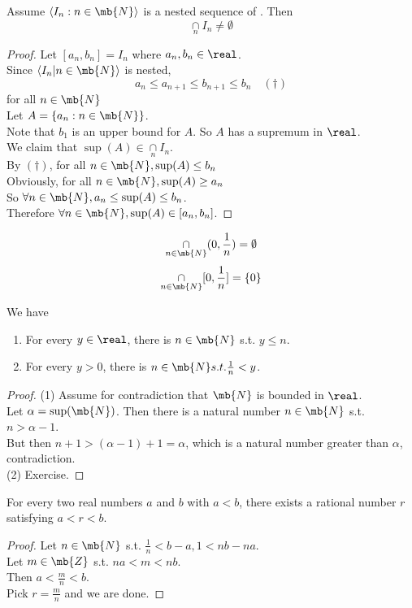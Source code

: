 \documentclass[11pt]{article}
\begin{document}
Assume $\langle I_n: n \in \mb{N}\rangle$ is a nested sequence of . Then $$\underset{n}{\cap} I_n \neq \emptyset$$
\begin{proof}
Let $[a_n, b_n] = I_n$ where $a_n, b_n \in \real$. \\
Since $\langle I_n | n \in \mb{N} \rangle$ is nested,
$$a_n \leq a_{n+1} \leq b_{n+1} \leq b_n \quad (\dagger)$$ for all $n \in \mb{N}$\\
Let $A = \{ a_n: n \in \mb{N} \}$.\\
Note that $b_1$ is an upper bound for $A$. So $A$ has a supremum in $\real$. \\
We claim that $\sup(A) \in \underset{n}{\cap} I_n$.\\
By $(\dagger)$, for all $n \in \mb{N}, \sup(A) \leq b_n$\\
Obviously, for all $n \in \mb{N}, \sup(A) \geq a_n$\\
So $\forall n \in \mb{N}, a_n \leq \sup(A) \leq b_n$. \\
Therefore $\forall n \in \mb{N}, \sup(A) \in [a_n, b_n]$. 
\end{proof}

\example
$$\underset{n \in \mb{N}}{\cap} (0, \frac{1}{n}) = \emptyset$$
$$\underset{n \in \mb{N}}{\cap} [0, \frac{1}{n}] = \{0\}$$

We have
\begin{enumerate}
	\item For every $y \in \real$, there is $n \in \mb{N}$ s.t. $y \leq n$.
	\item For every $y > 0$, there is $n \in \mb{N} s.t. \frac{1}{n} < y$.
\end{enumerate}
\begin{proof}
	(1) Assume for contradiction that $\mb{N}$ is bounded in $\real$. \\
	Let $\alpha = \sup(\mb{N})$. Then there is a natural number $n \in \mb{N}$ s.t. $n > \alpha - 1$. \\
	But then $n + 1 > (\alpha - 1) + 1 = \alpha$, which is a natural number greater than $\alpha$, contradiction. \\
	(2) Exercise.
\end{proof}

For every two real numbers $a$ and $b$ with $a < b$, there exists a rational number $r$ satisfying $a < r < b$.
\begin{proof}
Let $n \in \mb{N}$ s.t. $\frac{1}{n} < b - a, 1 < nb - na$. \\
Let $m \in \mb{Z}$ s.t. $na < m < nb$. \\
Then $a < \frac{m}{n} < b$. \\
Pick $r = \frac{m}{n}$ and we are done.
\end{proof}
\end{document}
